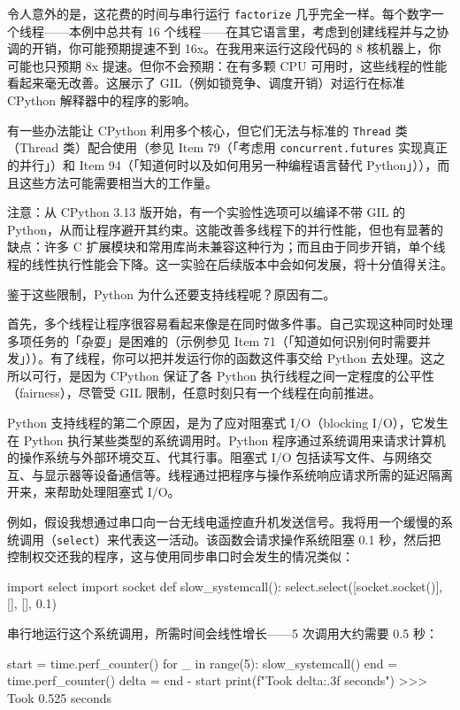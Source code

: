 令人意外的是，这花费的时间与串行运行 \texttt{factorize} 几乎完全一样。每个数字一个线程——本例中总共有 16 个线程——在其它语言里，考虑到创建线程并与之协调的开销，你可能预期提速不到 16x。在我用来运行这段代码的 8 核机器上，你可能也只预期 8x 提速。但你不会预期：在有多颗 CPU 可用时，这些线程的性能看起来毫无改善。这展示了 GIL（例如锁竞争、调度开销）对运行在标准 CPython 解释器中的程序的影响。

有一些办法能让 CPython 利用多个核心，但它们无法与标准的 \texttt{Thread} 类（Thread 类）配合使用（参见 Item 79（「考虑用 \texttt{concurrent.futures} 实现真正的并行」）和 Item 94（「知道何时以及如何用另一种编程语言替代 Python」）），而且这些方法可能需要相当大的工作量。

注意：从 CPython 3.13 版开始，有一个实验性选项可以编译不带 GIL 的 Python，从而让程序避开其约束。这能改善多线程下的并行性能，但也有显著的缺点：许多 C 扩展模块和常用库尚未兼容这种行为；而且由于同步开销，单个线程的线性执行性能会下降。这一实验在后续版本中会如何发展，将十分值得关注。

鉴于这些限制，Python 为什么还要支持线程呢？原因有二。

首先，多个线程让程序很容易看起来像是在同时做多件事。自己实现这种同时处理多项任务的「杂耍」是困难的（示例参见 Item 71（「知道如何识别何时需要并发」））。有了线程，你可以把并发运行你的函数这件事交给 Python 去处理。这之所以可行，是因为 CPython 保证了各 Python 执行线程之间一定程度的公平性（fairness），尽管受 GIL 限制，任意时刻只有一个线程在向前推进。

Python 支持线程的第二个原因，是为了应对阻塞式 I/O（blocking I/O），它发生在 Python 执行某些类型的系统调用时。Python 程序通过系统调用来请求计算机的操作系统与外部环境交互、代其行事。阻塞式 I/O 包括读写文件、与网络交互、与显示器等设备通信等。线程通过把程序与操作系统响应请求所需的延迟隔离开来，来帮助处理阻塞式 I/O。

例如，假设我想通过串口向一台无线电遥控直升机发送信号。我将用一个缓慢的系统调用（\texttt{select}）来代表这一活动。该函数会请求操作系统阻塞 0.1 秒，然后把控制权交还我的程序，这与使用同步串口时会发生的情况类似：

\begin{codebox}[python]
import select
import socket
def slow_systemcall():
    select.select([socket.socket()], [], [], 0.1)
\end{codebox}

串行地运行这个系统调用，所需时间会线性增长——5 次调用大约需要 0.5 秒：

\begin{codebox}[python]
start = time.perf_counter()
for _ in range(5):
    slow_systemcall()
end = time.perf_counter()
delta = end - start
print(f"Took {delta:.3f} seconds")
>>>
Took 0.525 seconds
\end{codebox}

